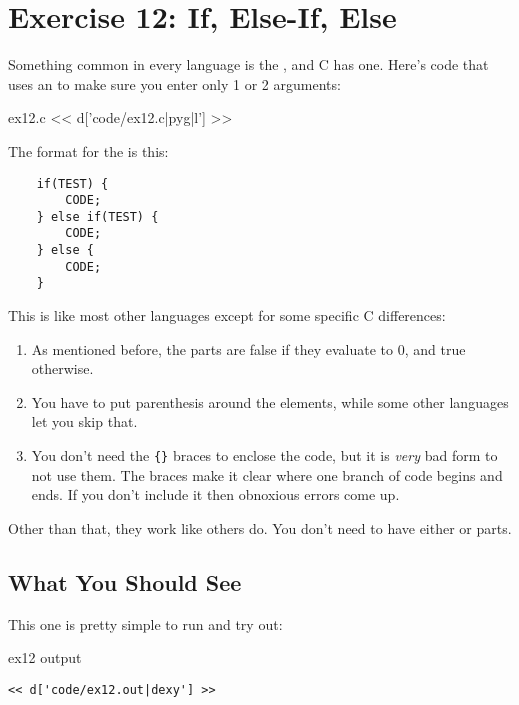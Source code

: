\chapter{Exercise 12: If, Else-If, Else}

Something common in every language is the , and
C has one.  Here's code that uses an  to make 
sure you enter only 1 or 2 arguments:

\begin{code}{ex12.c}
<< d['code/ex12.c|pyg|l'] >>
\end{code}

The format for the  is this:

\begin{Verbatim}
    if(TEST) {
        CODE;
    } else if(TEST) {
        CODE;
    } else {
        CODE;
    }
\end{Verbatim}

This is like most other languages except for some specific C 
differences:

\begin{enumerate}
\item As mentioned before, the  parts are false if they
    evaluate to 0, and true otherwise.
\item You have to put parenthesis around the  elements,
    while some other languages let you skip that.
\item You don't need the \verb|{}| braces to enclose the code, but
    it is \emph{very} bad form to not use them.  The braces make it
    clear where one branch of code begins and ends.  If you don't 
    include it then obnoxious errors come up.
\end{enumerate}

Other than that, they work like others do.  You don't need to have
either  or  parts.

\section{What You Should See}

This one is pretty simple to run and try out:

\begin{code}{ex12 output}
\begin{lstlisting}
<< d['code/ex12.out|dexy'] >>
\end{lstlisting}
\end{code}

